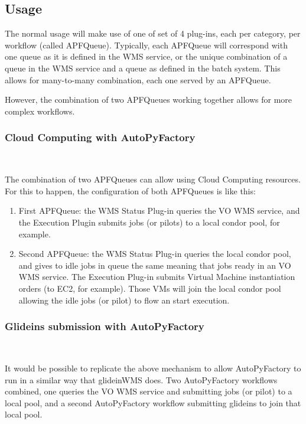 \documentclass[a4paper]{jpconf}
\begin{document}
\subsection{Usage}

The normal usage will make use of one of set of 4 plug-ins, each per category, per workflow (called APFQueue). 
Typically, each APFQueue will correspond with one queue as it is defined in the WMS service, 
or the unique combination of a queue in the WMS service and a queue as defined in the batch system. 
This allows for many-to-many combination, each one served by an APFQueue. 

However, the combination of two APFQueues working together allows for more complex workflows.

\subsubsection{Cloud Computing with AutoPyFactory }

~

\noindent The combination of two APFQueues can allow using Cloud Computing resources. 
For this to happen, the configuration of both APFQueues is like this:

\begin{enumerate}
\item First APFQueue: 
the WMS Status Plug-in queries the VO WMS service, and the Execution Plugin submits jobs (or pilots) to a local condor pool, for example.
\item Second APFQueue: 
the WMS Status Plug-in queries the local condor pool, 
and gives to idle jobs in queue the same meaning that jobs ready in an VO WMS service. 
The Execution Plug-in submits Virtual Machine instantiation orders (to EC2, for example). 
Those VMs will join the local condor pool allowing the idle jobs (or pilot) to flow an start execution. 
\end{enumerate}

\subsubsection{Glideins submission with AutoPyFactory}

~

\noindent It would be possible to replicate the above mechanism to allow AutoPyFactory to run in a similar way that glideinWMS does. 
Two AutoPyFactory workflows combined, one queries the VO WMS service and submitting jobs (or pilot) to a local pool, 
and a second AutoPyFactory workflow submitting glideins to join that local pool. 
\end{document}
